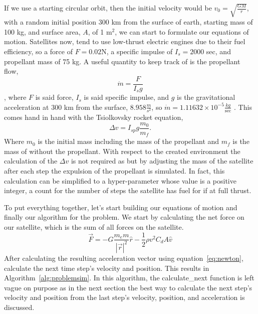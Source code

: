 If we use a starting circular orbit, then the initial velocity would be $v_0=\sqrt{\frac{GM}{r}}$, with a random initial position 300 km from the surface of earth, starting mass of 100 kg, and surface area, $A$, of 1 $\text{m}^2$, we can start to formulate our equations of motion. Satellites now, tend to use low-thrust electric engines due to their fuel efficiency, so a force of $F=0.02$N, a specific impulse of $I_s=2000$ sec, and propellant mass of 75 kg. A useful quantity to keep track of is the propellant flow, 
\begin{equation}
\dot{m}=\frac{F}{I_sg}
\end{equation}
, where $F$ is said force, $I_s$ is said specific impulse, and $g$ is the gravitational acceleration at 300 km from the surface, $8.958\frac{m}{s^2}$, so $\dot{m}=1.11632\times 10^{-5}\frac{kg}{\text{sec}}$ \cite{sutton_biblarz_2017}. This comes hand in hand with the Tsiolkovsky rocket equation, $$\Delta v=I_{sp}g\frac{m_0}{m_f}.$$ Where $m_0$ is the initial mass including the mass of the propellant and $m_f$ is the mass of without the propellant. With respect to the created environment the calculation of the $\Delta v$ is not required as but by adjusting the mass of the satellite after each step the expulsion of the propellant is simulated. In fact, this calculation can be simplified to a hyper-parameter whose value is a positive integer, a count for the number of steps the satellite has fuel for if at full thrust.

To put everything together, let's start building our equations of motion and finally our algorithm for the problem. We start by calculating the net force on our satellite, which is the sum of all forces on the satellite. 
\begin{equation}
\vec{F}=-G\frac{m_e m}{|\vec{r}|^2}\hat{r}-\frac{1}{2}\rho v^2 C_d A\hat{v}
\end{equation}
After calculating the resulting acceleration vector using equation~\ref{eq:newton}, calculate the next time step's velocity and position. This results in Algorithm~\ref{alg:problemsim}. In this algorithm, the calculate\_next function is left vague on purpose as in the next section the best way to calculate the next step's velocity and position from the last step's velocity, position, and acceleration is discussed.

